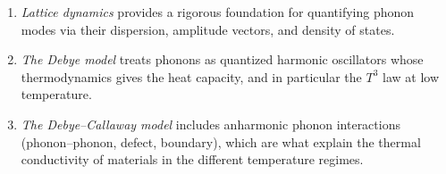 \begin{fact}[Summary]
\begin{enumerate}
    \item \emph{Lattice dynamics} provides a rigorous foundation for quantifying phonon modes via their dispersion, amplitude vectors, and density of states.
    \item \emph{The Debye model} treats phonons as quantized harmonic oscillators whose thermodynamics gives the heat capacity, and in particular the $T^3$ law at low temperature.
    \item \emph{The Debye--Callaway model} includes anharmonic phonon interactions (phonon--phonon, defect, boundary), which are what explain the thermal conductivity of materials in the different temperature regimes.
\end{enumerate}
\end{fact}

